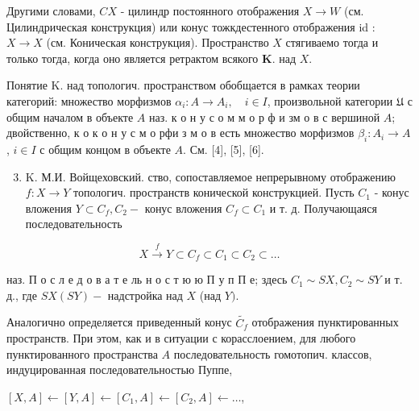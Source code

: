 \documentclass[10pt]{article}
\begin{document}
Другими словами, $C X$ - цилиндр постоянного отображения $X \rightarrow W$ (см. Цилиндрическая конструкция) или конус тожкдестенного отображения id : $X \rightarrow X$ (см. Коническая конструкция). Пространство $X$ стягиваемо тогда и только тогда, когда оно является ретрактом всякого $\mathbf{K}$. над $X$.



Понятие K. над топологич. пространством обобщается в рамках теории категорий: множество морфизмов $\alpha_{i}: A \rightarrow A_{i}, \quad i \in I$, произвольной категории $\mathfrak{U}$ с общим началом в объекте $A$ наз. к о н у с о м м о р ф и зм о в с вершиной $A$; двойственно, к о к о н у с м о рфи з м о в есть множество морфизмов $\beta_{i}: A_{i} \rightarrow A$, $i \in I$ с общим концом в объекте $A$. См. [4], [5], [6].



\begin{enumerate}

  \setcounter{enumi}{2}

  \item K. М.И. Войщеховский. ство, сопоставляемое непрерывному отображению $f: X \rightarrow Y$ топологич. пространств конической конструкцией. Пусть $C_{1}$ - конус вложения $Y \subset C_{f}, C_{2}-$ конус вложения $C_{f} \subset C_{1}$ и т. д. Получающаяся последовательность

\end{enumerate}



\[

X \stackrel{f}{\longrightarrow} Y \subset C_{f} \subset C_{1} \subset C_{2} \subset \ldots

\]



наз. П о с л е д о в а т е ль н о с т ю ю П у п П е; здесь $C_{1} \sim S X, C_{2} \sim S Y$ и т. д., где $S X(S Y)-$ надстройка над $X$ (над $Y)$.



Аналогично определяется приведенный конус $\tilde{C_{f}}$ отображения пунктированных пространств. При этом, как и в ситуации с корасслоением, для любого пунктированного пространства $A$ последовательность гомотопич. классов, индуцированная последовательностью Пуппе,



$[X, A] \longleftarrow[Y, A] \longleftarrow\left[C_{1}, A\right] \longleftarrow\left[C_{2}, A\right] \longleftarrow \ldots$,
\end{document}
